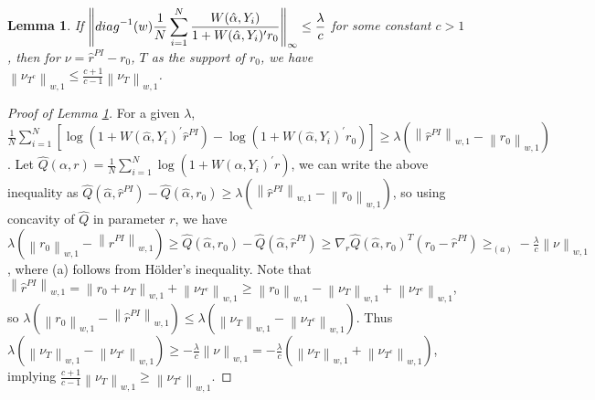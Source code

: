 \documentclass[11pt]{article}
\newtheorem{lemma}{Lemma}
\newcommand{\norm}[1]{\left\lVert #1 \right\rVert}
\begin{document}
\begin{lemma}\label{lem:diff-restricted}
If {$\displaystyle\norm{{\rm diag}^{-1}(w)\frac{1}{N}\sum_{i=1}^N\frac{W(\hat\alpha,Y_i)}{1+W(\hat\alpha,Y_i)^\prime r_0}}_\infty\leq\frac{\lambda}{c}$} for some constant $c>1$, then for $\nu=\hat r^{PI}-r_0$, $T$ as the support of $r_0$, we have $\displaystyle\norm{\nu_{T^c}}_{w,1}\leq\frac{c+1}{c-1}\norm{\nu_T}_{w,1}$. 
\end{lemma}
\begin{proof}[Proof of Lemma \ref{lem:diff-restricted}]
For a given $\lambda$, $\frac{1}{N}\sum_{i=1}^N\left[\log\left(1+W(\hat\alpha,Y_i)^\prime\hat r^{PI}\right)-\log\left(1+W\left(\hat\alpha,Y_i\right)^\prime r_0\right)\right]\geq\lambda\left(\norm{\hat r^{PI}}_{w,1}-\norm{r_0}_{w,1}\right)$.
Let $\hat Q(\alpha,r)=\frac{1}{N}\sum_{i=1}^N\log\left(1+W\left(\alpha,Y_i\right)^\prime r\right)$, we can write the above inequality as $\hat Q(\hat\alpha,\hat r^{PI})-\hat Q(\hat\alpha,r_0)\geq\lambda\left(\norm{\hat r^{PI}}_{w,1}-\norm{r_0}_{w,1}\right)$,
so using concavity of $\hat Q$ in parameter $r$, we have $\lambda\left(\norm{r_0}_{w,1}-\norm{\hat r^{PI}}_{w,1}\right)\geq\hat Q\left(\hat\alpha,r_0\right)-\hat Q\left(\hat\alpha,\hat r^{PI}\right)\geq\nabla_r\hat Q(\hat\alpha,r_0)^T(r_0-\hat r^{PI})\geq_{(a)}-\frac{\lambda}{c}\norm{\nu}_{w,1}$,
where (a) follows from H\"older's inequality. Note that $\norm{\hat r^{PI}}_{w,1}=\norm{r_0+\nu_T}_{w,1}+\norm{\nu_{T^c}}_{w,1}\geq\norm{r_0}_{w,1}-\norm{\nu_T}_{w,1}+\norm{\nu_{T^c}}_{w,1}$, so $\lambda(\norm{r_0}_{w,1}-\norm{\hat r^{PI}}_{w,1})\leq\lambda\left(\norm{\nu_T}_{w,1}-\norm{\nu_{T^c}}_{w,1}\right)$. Thus $\lambda\left(\norm{\nu_T}_{w,1}-\norm{\nu_{T^c}}_{w,1}\right)\geq-\frac{\lambda}{c}\norm{\nu}_{w,1}=-\frac{\lambda}{c}\left(\norm{\nu_T}_{w,1}+\norm{\nu_{T^c}}_{w,1}\right)$,
implying $\frac{c+1}{c-1}\norm{\nu_T}_{w,1}\geq\norm{\nu_{T^c}}_{w,1}$.
\end{proof}
\end{document}
